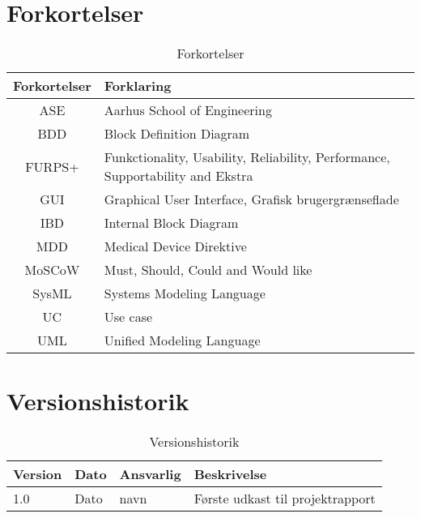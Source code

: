 \chapter{Forkortelser}

\begin{table}[htb]
\centering
\begin{tabular}{ | c | p{} | }
\hline
\textbf{Forkortelser} & \textbf{Forklaring} \\\hline
ASE & Aarhus School of Engineering \\\hline
BDD & Block Definition Diagram \\\hline
FURPS+ & Funkctionality, Usability, Reliability, Performance, Supportability and Ekstra \\\hline
GUI & Graphical User Interface, Grafisk brugergrænseflade \\\hline
IBD & Internal Block Diagram \\\hline
MDD & Medical Device Direktive \\\hline
MoSCoW & Must, Should, Could and Would like \\\hline
SysML & Systems Modeling Language \\\hline
UC & Use case \\\hline
UML & Unified Modeling Language \\\hline
\end{tabular}
\caption{Forkortelser}
\end{table}

\vspace{3cm}

{\let\clearpage\relax\chapter{Versionshistorik}}

\begin{table}[htb]
\begin{tabular}{ | l | l | l | p{} | }
\hline
\textbf{Version} & \textbf{Dato} & \textbf{Ansvarlig} & \textbf{Beskrivelse} \\\hline
1.0 & Dato & navn & Første udkast til projektrapport\\\hline
\end{tabular}
\caption{Versionshistorik}
\end{table}